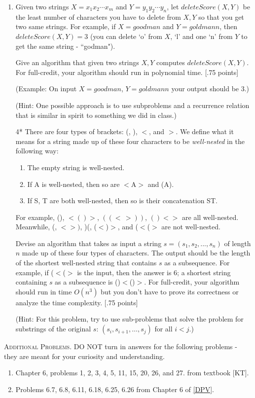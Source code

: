 \documentclass[11pt]{article}
\begin{document}
\begin{enumerate}
\item Given two strings $X = x_1x_2\cdots x_m$ and $Y = y_1 y_2 \cdots y_n$, let $deleteScore(X,Y)$ be the least number of characters you have to delete from $X,Y$ so that you get two same strings. For example, if $X = goodman$ and $Y = goldmann$, then $deleteScore(X,Y) = 3$ (you can delete `o' from $X$, `l' and one `n' from $Y$ to get the same string - ``godman"). 

Give an algorithm that given two strings $X,Y$ computes $deleteScore(X,Y)$. For full-credit, your algorithm should run in polynomial time. {\color{blue} [.75 points]}

(Example: On input $X = goodman$, $Y = goldmann$ your output should be $3$.)


(Hint: One possible approach is to use subproblems and a recurrence relation that is similar in spirit to something we did in class.)

\item[4*] There are four types of brackets: (,  ), $<$, and $>$. We define what it means for a string made up of these four characters to be {\em well-nested} in the following way:
\begin{enumerate}
\item The empty string is well-nested.
\item If A is well-nested, then so are $<$A$>$ and (A).
\item If S, T are both well-nested, then so is their concatenation ST.
\end{enumerate}

For example, (), $< ()>$, $((<\,>))$, $()< >$ are all well-nested. Meanwhile, (, $< >)$, )(, ($<$)$>$, and ($<$($>$ are not well-nested.


Devise an algorithm that takes as input a string $s = (s_1,s_2,...,s_n)$ of length $n$ made up of these four types of characters. The output should be the length of the shortest well-nested string that contains $s$ as a subsequence. For example, if ($<$($>$ is the input, then the answer is 6; a shortest string containing $s$ as a subsequence is ()$<$()$>$. For full-credit, your algorithm should run in time $O(n^3)$ but you don't have to prove its correctness or analyze the time complexity. {\color{blue} [.75 points]}


(Hint: For this problem, try to use sub-problems that solve the problem for substrings of the original $s$: $(s_i,s_{i+1},\ldots,s_j)$ for all $i < j$.)
\end{enumerate}

\textsc{Additional Problems}. DO NOT turn in answers for the following problems - they are meant for your curiosity and understanding.
\begin{enumerate}
\item Chapter 6, problems 1, 2, 3, 4, 5, 11, 15, 20, 26, and 27.  from textbook [KT].
\item Problems 6.7, 6.8, 6.11, 6.18, 6.25, 6.26 from Chapter 6 of \href{https://people.eecs.berkeley.edu/~vazirani/algorithms/chap6.pdf}{[DPV]}.
\end{enumerate}
\end{document}
